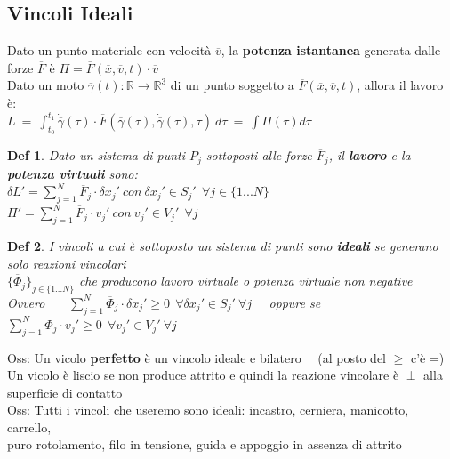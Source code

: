 \documentclass{article}
\theoremstyle{unnumbered}
\newtheorem* {theoremT}{Def}
\theoremstyle{unnumbered1}
\newenvironment{defi}{\begin{gBox}\begin{theoremT}}{\end{theoremT}\end{gBox}}
\begin{document}
\subsection{Vincoli Ideali}
%
Dato un punto materiale con velocità $\overline{v}$, la \textbf{potenza istantanea} generata dalle forze $\overline{F}$ è $\Pi=\overline{F}(\overline{x},\overline{v},t)\cdot \overline{v}$ \\
%
Dato un moto $\overline{\gamma}(t):\mathbb{R}\rightarrow\mathbb{R}^3$ di un punto soggetto a $\overline{F}(\overline{x},\overline{v},t)$, allora il lavoro è:\\
\phantom{}\hspace{2in} $L \ =\ \int^{t_1}_{t_0} \dot{\overline{\gamma}}(\tau)\cdot\overline{F}(\overline{\gamma}(\tau),\dot{\overline{\gamma}}(\tau),\tau)\ d\tau \ = \ \int\Pi(\tau)d\tau$ \\
%
%
%
\begin{defi}
Dato un sistema di punti $P_j$ sottoposti alle forze $\overline{F}_j$, il \textbf{lavoro} e la \textbf{potenza virtuali} sono:\\
\phantom{\ \ \ } $\delta L'=\sum^N_{j=1}\overline{F}_j\cdot\delta x_j' \ con \ \delta x_j' \in S_j' \ \ \forall j \in \{ 1...N\}$
\ \ \ \ $\Pi'=\sum^N_{j=1}\overline{F}_j\cdot v_j' \ con \ v_j' \in V_j' \ \ \forall j$
\end{defi}
%
%
%
\begin{defi}
I vincoli a cui è sottoposto un sistema di punti sono \textbf{ideali} se generano solo reazioni vincolari \\
$\{\overline{\Phi}_j\}_{j\in\{1...N\}}$ che producono lavoro virtuale o potenza virtuale non negative \\
Ovvero \ \ \ $\sum^N_{j=1}\overline{\Phi}_j\cdot\delta x_j'\geq 0 \ \ \forall \delta x_j' \in S_j' \ \forall j$ \ \ oppure se \ \ \ $\sum^N_{j=1}\overline{\Phi}_j\cdot v_j'\geq 0 \ \ \forall v_j' \in V_j' \ \forall j$
\end{defi}
Oss: Un vicolo \textbf{perfetto} è un vincolo ideale e bilatero \ \ (al posto del $\geq$ c'è =)\\
\phantom{Oss: }Un vicolo è liscio se non produce attrito e quindi la reazione vincolare è $\perp$ alla superficie di contatto \\
Oss: Tutti i vincoli che useremo sono ideali: incastro, cerniera, manicotto, carrello, \\
\phantom{Oss: }puro rotolamento, filo in tensione, guida e appoggio in assenza di attrito \\
%
%
%
\end{document}
